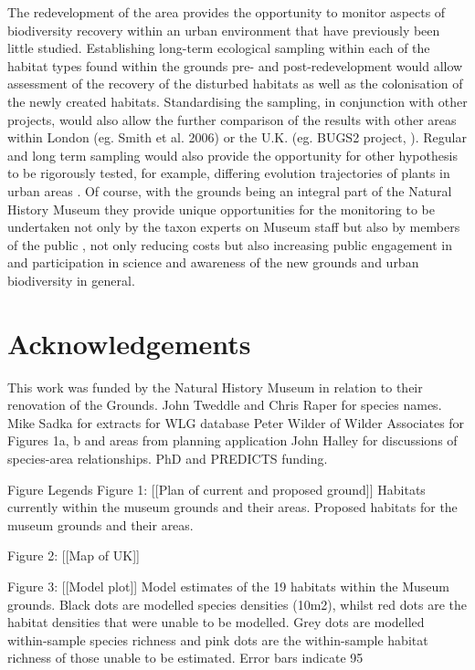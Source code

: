 The redevelopment of the area provides the opportunity to monitor aspects of biodiversity recovery within an urban environment that have previously been little studied. Establishing long-term ecological sampling within each of the habitat types found within the grounds pre- and post-redevelopment would allow assessment of the recovery of the disturbed habitats as well as the colonisation of the newly created habitats.  Standardising the sampling, in conjunction with other projects, would also allow the further comparison of the results with other areas within London (eg. Smith et al. 2006) or the U.K. (eg. BUGS2 project, \citealt{Loram:2007le}).  Regular and long term sampling would also provide the opportunity for other hypothesis to be rigorously tested, for example, differing evolution trajectories of plants in urban areas \citep{Johnson:2015ajb}.  Of course, with the grounds being an integral part of the Natural History Museum they provide unique opportunities for the monitoring to be undertaken not only by the taxon experts on Museum staff but also by members of the public \citep{Silvertown:2009tree; Roy:2012citsci}, not only reducing costs but also increasing public engagement in and participation in science and awareness of the new grounds and urban biodiversity in general. 


\section{Acknowledgements}
This work was funded by the Natural History Museum in relation to their renovation of the Grounds.
John Tweddle and Chris Raper for species names.
Mike Sadka for extracts for WLG database
Peter Wilder of Wilder Associates for Figures 1a, b and areas from planning application
John Halley for discussions of species-area relationships.
PhD and PREDICTS funding.

Figure Legends
Figure 1: [[Plan of current and proposed ground]]
Habitats currently within the museum grounds and their areas.
Proposed habitats for the museum grounds and their areas.

Figure 2: [[Map of UK]]

Figure 3: [[Model plot]]
Model estimates of the 19 habitats within the Museum grounds. Black dots are modelled species densities (10m2), whilst red dots are the habitat densities that were unable to be modelled. Grey dots are modelled within-sample species richness and pink dots are the within-sample habitat richness of those unable to be estimated. Error bars indicate 95%

